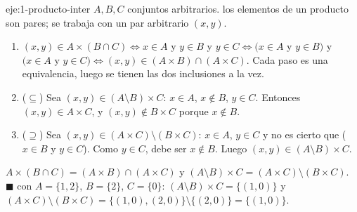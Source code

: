 \begin{solucion}{eje:1-producto-inter}
\datos $A,B,C$ conjuntos arbitrarios.
\planteamiento los elementos de un producto son pares; se trabaja con un par arbitrario $(x,y)$.
\pasos
\begin{enumerate}[label=\arabic*.]
  \item $(x,y)\in A\times(B\cap C)\iff x\in A$ y $y\in B$ y $y\in C\iff(x\in A$ y $y\in B)$ y $(x\in A$ y $y\in C)\iff(x,y)\in(A\times B)\cap(A\times C)$. Cada paso es una equivalencia, luego se tienen las dos inclusiones a la vez.
  \item ($\subseteq$) Sea $(x,y)\in(A\setminus B)\times C$: $x\in A$, $x\notin B$, $y\in C$. Entonces $(x,y)\in A\times C$, y $(x,y)\notin B\times C$ porque $x\notin B$.
  \item ($\supseteq$) Sea $(x,y)\in(A\times C)\setminus(B\times C)$: $x\in A$, $y\in C$ y no es cierto que ($x\in B$ y $y\in C$). Como $y\in C$, debe ser $x\notin B$. Luego $(x,y)\in(A\setminus B)\times C$.
\end{enumerate}
\resultado $A\times(B\cap C)=(A\times B)\cap(A\times C)$ y $(A\setminus B)\times C=(A\times C)\setminus(B\times C)$. \hfill$\blacksquare$
\comprobacion con $A=\{1,2\}$, $B=\{2\}$, $C=\{0\}$: $(A\setminus B)\times C=\{(1,0)\}$ y $(A\times C)\setminus(B\times C)=\{(1,0),(2,0)\}\setminus\{(2,0)\}=\{(1,0)\}$.
\end{solucion}

